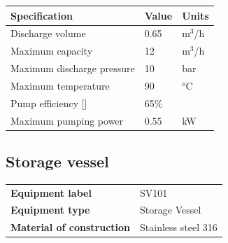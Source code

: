 \begin{table}[H]
\centering
\begin{tabular}{@{}l|l|l@{}}
\toprule
\textbf{Specification}                    & \textbf{Value} & \textbf{Units} \\ \midrule
Discharge volume                              & 0.65            & m$^3$/h            \\ \midrule
Maximum capacity                  & 12       &  m$^3$/h       \\ \midrule
Maximum discharge pressure       & 10         &     bar           \\ \midrule
Maximum temperature                  & 90     & °C         \\ \midrule
Pump efficiency []               & 65\%         &            \\ \midrule
Maximum pumping power                     & 0.55     & kW           \\ \bottomrule
\end{tabular}
\end{table}

\newpage
\subsection{Storage vessel}
\begin{table}[H]
    \centering
    \begin{tabular}{@{}l|l@{}}
    \toprule
      \textbf{Equipment label}  & SV101\\
       \textbf{Equipment type}  & Storage Vessel \\
       \textbf{Material of construction} & Stainless steel 316 \\
       \bottomrule
    \end{tabular}
\end{table}

